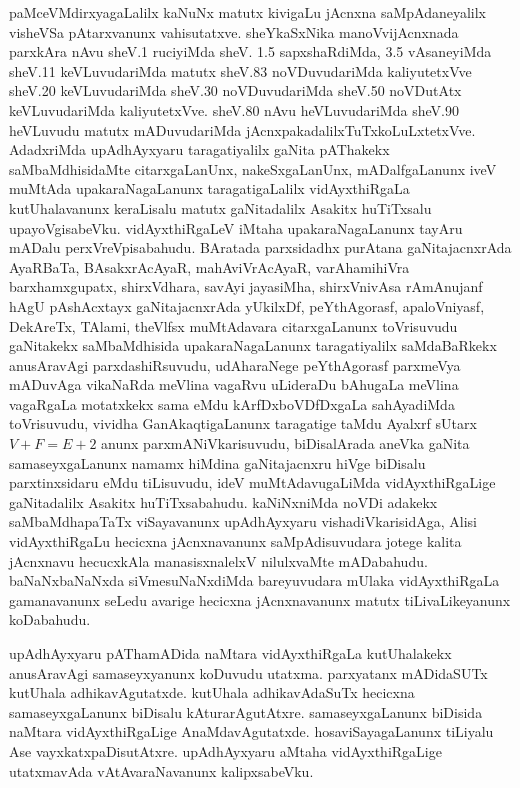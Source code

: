 paMceVMdirxyagaLalilx kaNuNx matutx kivigaLu jAcnxna saMpAdaneyalilx visheVSa pAtarxvanunx vahisutatxve. sheYkaSxNika manoVvijAcnxnada parxkAra nAvu sheV.{\rm 1} ruciyiMda sheV. 
{\rm 1.5} sapxshaRdiMda, {\rm 3.5} vAsaneyiMda sheV.{\rm 11} keVLuvudariMda matutx sheV.{\rm 83} noVDuvudariMda kaliyutetxVve sheV.{\rm 20} keVLuvudariMda sheV.{\rm 30} noVDuvudariMda sheV.{\rm 50} noVDutAtx keVLuvudariMda kaliyutetxVve. sheV.{\rm 80} nAvu heVLuvudariMda sheV.{\rm 90} heVLuvudu matutx mADuvudariMda jAcnxpakadalilxTuTxkoLuLxtetxVve. AdadxriMda upAdhAyxyaru taragatiyalilx gaNita pAThakekx saMbaMdhisidaMte citarxgaLanUnx, nakeSxgaLanUnx, mADalfgaLanunx iveV muMtAda upakaraNagaLanunx taragatigaLalilx vidAyxthiRgaLa kutUhalavanunx keraLisalu matutx gaNitadalilx Asakitx huTiTxsalu upayoVgisabeVku. vidAyxthiRgaLeV iMtaha upa\-karaNagaLanunx tayAru mADalu perxVreVpisabahudu. BAratada parxsidadhx purAtana gaNitajacnxrAda AyaRBaTa, BAsakxrAcAyaR, mahAviVrAcAyaR, varAhamihiVra barxhamxgupatx, shirxVdhara, savAyi jayasiMha, shirxVnivAsa rAmAnujanf hAgU pAshAcxtayx gaNitajacnxrAda yUkilxDf, peYthAgorasf, apaloVniyasf, DekAreTx, TAlami, theVlfsx muMtAdavara citarxgaLanunx toVrisuvudu gaNitakekx saMbaMdhisida upakaraNagaLanunx taragatiyalilx saMdaBaRkekx anusAravAgi parxdashiRsuvudu, udAharaNege peYthAgorasf parxmeVya mADuvAga vikaNaRda meVlina vagaRvu uLideraDu bAhugaLa meVlina vagaRgaLa motatxkekx sama eMdu kArfDxboVDfDxgaLa sahAyadiMda toVrisuvudu, vividha GanAkaqtigaLanunx taragatige taMdu Ayalxrf sUtarx $V+F=E+2$ anunx parxmANiVkarisuvudu, biDisalArada aneVka gaNita samaseyxgaLanunx namamx hiMdina gaNitajacnxru hiVge biDisalu parxtinxsidaru eMdu tiLisuvudu, ideV muMtAdavugaLiMda vidAyxthiRgaLige gaNitadalilx Asakitx huTiTxsabahudu. kaNiNxniMda noVDi adakekx saMbaMdha\-paTaTx viSayavanunx upAdhAyxyaru vishadiVkarisidAga, Alisi vidAyxthiRgaLu hecicxna jAcnxnavanunx saMpAdisuvudara jotege kalita jAcnxnavu hecucxkAla manasisxnalelxV nilulxvaMte mADabahudu. baNaNxbaNaNxda siVmesuNaNxdiMda bareyuvudara mUlaka vidAyxthiRgaLa gamanavanunx seLedu avarige hecicxna jAcnxnavanunx matutx tiLivaLikeyanunx koDabahudu.

upAdhAyxyaru pAThamADida naMtara vidAyxthiRgaLa kutUhalakekx anusAravAgi samaseyxyanunx koDuvudu utatxma. parxyatanx mADidaSUTx kutUhala adhikavAgutatxde. kutUhala adhikavAdaSuTx hecicxna samaseyxgaLanunx biDisalu kAturarAgutAtxre. samaseyx\-gaLanunx biDisida naMtara vidAyxthiRgaLige AnaMdavAgutatxde. hosaviSayagaLanunx tiLiyalu Ase vayxkatxpaDisutAtxre. upAdhAyxyaru aMtaha vidAyxthiRgaLige utatxmavAda vAtAvaraNavanunx kalipxsabeVku.

